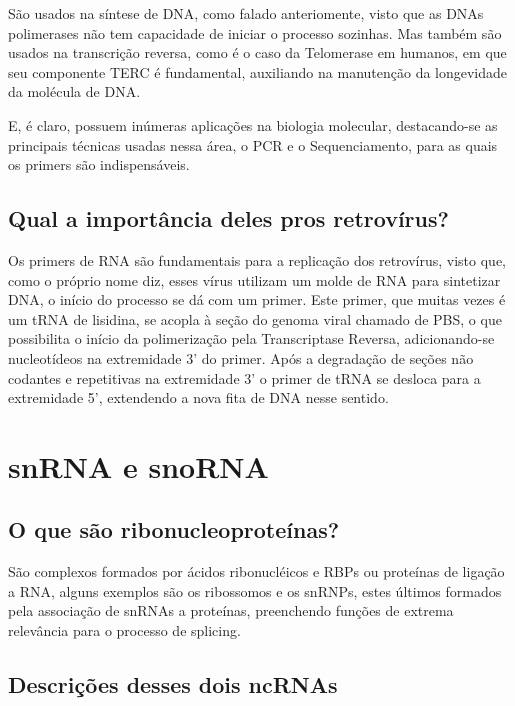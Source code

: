 \documentclass[
]{book}
\begin{document}
São usados na síntese de DNA, como falado anteriomente, visto que as DNAs polimerases não tem capacidade de iniciar o processo sozinhas. Mas também são usados na transcrição reversa, como é o caso da Telomerase em humanos, em que seu componente TERC é fundamental, auxiliando na manutenção da longevidade da molécula de DNA.

E, é claro, possuem inúmeras aplicações na biologia molecular, destacando-se as principais técnicas usadas nessa área, o PCR e o Sequenciamento, para as quais os primers são indispensáveis.

\hypertarget{qual-a-importuxe2ncia-deles-pros-retrovuxedrus}{%
\section{Qual a importância deles pros retrovírus?}\label{qual-a-importuxe2ncia-deles-pros-retrovuxedrus}}

Os primers de RNA são fundamentais para a replicação dos retrovírus, visto que, como o próprio nome diz, esses vírus utilizam um molde de RNA para sintetizar DNA, o início do processo se dá com um primer. Este primer, que muitas vezes é um tRNA de lisidina, se acopla à seção do genoma viral chamado de PBS, o que possibilita o início da polimerização pela Transcriptase Reversa, adicionando-se nucleotídeos na extremidade 3' do primer. Após a degradação de seções não codantes e repetitivas na extremidade 3' o primer de tRNA se desloca para a extremidade 5', extendendo a nova fita de DNA nesse sentido.

\hypertarget{snrna-e-snorna}{%
\chapter{snRNA e snoRNA}\label{snrna-e-snorna}}

\hypertarget{o-que-suxe3o-ribonucleoproteuxednas}{%
\section{O que são ribonucleoproteínas?}\label{o-que-suxe3o-ribonucleoproteuxednas}}

São complexos formados por ácidos ribonucléicos e RBPs ou proteínas de ligação a RNA,
alguns exemplos são os ribossomos e os snRNPs, estes últimos formados pela associação de snRNAs a proteínas, preenchendo funções de extrema relevância para o processo de splicing.

\hypertarget{descriuxe7uxf5es-desses-dois-ncrnas}{%
\section{Descrições desses dois ncRNAs}\label{descriuxe7uxf5es-desses-dois-ncrnas}}
\end{document}
